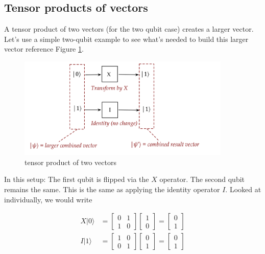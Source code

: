 \documentclass[main.tex]{subfiles}
\begin{document}
\subsection{Tensor products of vectors}

    A tensor product of two vectors (for the two qubit case) creates a larger vector. Let's use a simple two-qubit example to see what's needed to build this larger vector reference Figure \ref{fig:05tensor1}.

    \begin{figure}
        \centering
        \includegraphics[width=4in]{notes/figs/n06/05tensor1.png}
        \caption{tensor product of two vectors}
        \label{fig:05tensor1}
    \end{figure} 
    
    In this setup: The first qubit is flipped via the $X$ operator. The second qubit remains the same. This is the same as applying the identity operator $I$. Looked at individually, we would write
    
    $$
    \begin{aligned}
    X|0\rangle &=\left[\begin{array}{ll}
    0 & 1 \\
    1 & 0
    \end{array}\right]\left[\begin{array}{l}
    1 \\
    0
    \end{array}\right]=\left[\begin{array}{l}
    0 \\
    1
    \end{array}\right] \\
    I|1\rangle &=\left[\begin{array}{ll}
    1 & 0 \\
    0 & 1
    \end{array}\right]\left[\begin{array}{l}
    0 \\
    1
    \end{array}\right]=\left[\begin{array}{l}
    0 \\
    1
    \end{array}\right]
    \end{aligned}
    $$
    
\end{document}
